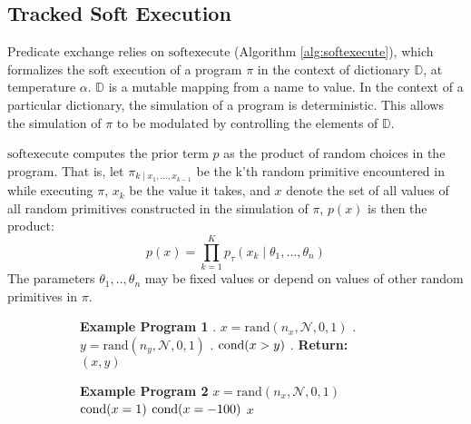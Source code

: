 \subsection{Tracked Soft Execution}
Predicate exchange relies on $\textrm{softexecute}$
(Algorithm \ref{alg:softexecute}), which formalizes the soft execution of a program $\pi$ in the context of dictionary $\mathbb{D}$, at temperature $\alpha$.
$\mathbb{D}$ is a mutable mapping from a name to value.
In the context of a particular dictionary, the simulation of a program is deterministic.
This allows the simulation of $\pi$ to be modulated by controlling the elements of $\mathbb{D}$.


$\textrm{softexecute}$ computes the prior term $p$ as the product of random choices in the program. 
That is, let $\pi_{k \mid x_1, ..., x_{k-1}}$ be the k'th random primitive encountered in while executing $\pi$, $x_k$ be the value it takes, and $x$ denote the set of all values of all random primitives constructed in the simulation of $\pi$, $p(x)$ is then the product:
\begin{equation}\label{productprob}
p(x) = \prod_{k=1}^K p_\tau(x_k \mid \theta_1,..., \theta_n )
\end{equation}
The parameters $\theta_1,..,\theta_n$ may be fixed values or depend on values of other random primitives in $\pi$.



\begin{figure}[t]
  \centering
  \begin{subfigure}[tb]{4cm}
      \begin{algorithmic}
      \STATE \textbf{Example Program 1}
      . $x = \textrm{rand}(n_x, \mathcal{N}, 0, 1)$
      . $y = \textrm{rand}(n_y, \mathcal{N}, 0, 1)$
      . $\operatorname{cond}(x > y)$
      . {\bfseries Return:} $(x, y)$
      \end{algorithmic}
  \end{subfigure}%
  \hfill
  \begin{subfigure}[tb]{4cm}
      \begin{algorithmic}
      \STATE \textbf{Example Program 2}
      \STATE $x = \textrm{rand}(n_x, \mathcal{N}, 0, 1)$
      \STATE $\operatorname{cond}(x = 1)$
      \ELSE
      \STATE $\operatorname{cond}(x = -100)$
      \ENDIF
       $x$
      \end{algorithmic}
  \end{subfigure}
\end{figure}

